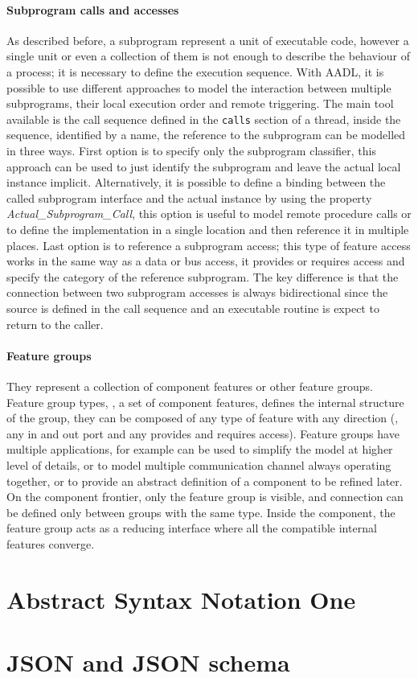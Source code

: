 \paragraph{Subprogram calls and accesses}
As described before, a subprogram represent a unit of executable code, however a single unit or even a collection of them is not enough to describe the behaviour of a process; it is necessary to define the execution sequence. With AADL, it is possible to use different approaches to model the interaction between multiple subprograms, their local execution order and remote triggering. The main tool available is the call sequence defined in the \texttt{calls} section of a thread, inside the sequence, identified by a name, the reference to the subprogram can be modelled in three ways. First option is to specify only the subprogram classifier, this approach can be used to just identify the subprogram and leave the actual local instance implicit. Alternatively, it is possible to define a binding between the called subprogram interface and the actual instance by using the property \textit{Actual\_Subprogram\_Call}, this option is useful to model remote procedure calls or to define the implementation in a single location and then reference it in multiple places. Last option is to reference a subprogram access; this type of feature access works in the same way as a data or bus access, it provides or requires access and specify the category of the reference subprogram. The key difference is that the connection between two subprogram accesses is always bidirectional since the source is defined in the call sequence and an executable routine is expect to return to the caller.

\paragraph{Feature groups}
They represent a collection of component features or other feature groups. Feature group types, \ie, a set of component features, defines the internal structure of the group, they can be composed of any type of feature with any direction (\ie, any in and out port and any provides and requires access). Feature groups have multiple applications, for example can be used to simplify the model at higher level of details, or to model multiple communication channel always operating together, or to provide an abstract definition of a component to be refined later. On the component frontier, only the feature group is visible, and connection can be defined only between groups with the same type. Inside the component, the feature group acts as a reducing interface where all the compatible internal features converge.

\section{Abstract Syntax Notation One}

\section{JSON and JSON schema}


